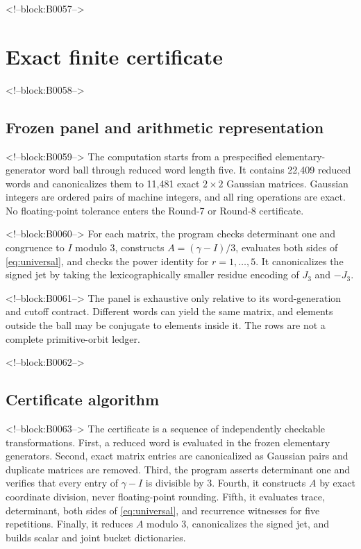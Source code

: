 \documentclass[11pt,a4paper]{article}
\theoremstyle{definition}
\theoremstyle{remark}
\begin{document}
<!--block:B0057-->
\section{Exact finite certificate}

<!--block:B0058-->
\subsection{Frozen panel and arithmetic representation}

<!--block:B0059-->
The computation starts from a prespecified elementary-generator word ball through reduced word length five. It contains 22,409 reduced words and canonicalizes them to 11,481 exact \(2\times2\) Gaussian matrices. Gaussian integers are ordered pairs of machine integers, and all ring operations are exact. No floating-point tolerance enters the Round-7 or Round-8 certificate.

<!--block:B0060-->
For each matrix, the program checks determinant one and congruence to \(I\) modulo \(3\), constructs \(A=(\gamma-I)/3\), evaluates both sides of \cref{eq:universal}, and checks the power identity for \(r=1,\ldots,5\). It canonicalizes the signed jet by taking the lexicographically smaller residue encoding of \(J_3\) and \(-J_3\).

<!--block:B0061-->
The panel is exhaustive only relative to its word-generation and cutoff contract. Different words can yield the same matrix, and elements outside the ball may be conjugate to elements inside it. The rows are not a complete primitive-orbit ledger.

<!--block:B0062-->
\subsection{Certificate algorithm}

<!--block:B0063-->
The certificate is a sequence of independently checkable transformations. First, a reduced word is evaluated in the frozen elementary generators. Second, exact matrix entries are canonicalized as Gaussian pairs and duplicate matrices are removed. Third, the program asserts determinant one and verifies that every entry of \(\gamma-I\) is divisible by \(3\). Fourth, it constructs \(A\) by exact coordinate division, never floating-point rounding. Fifth, it evaluates trace, determinant, both sides of \cref{eq:universal}, and recurrence witnesses for five repetitions. Finally, it reduces \(A\) modulo \(3\), canonicalizes the signed jet, and builds scalar and joint bucket dictionaries.
\end{document}
